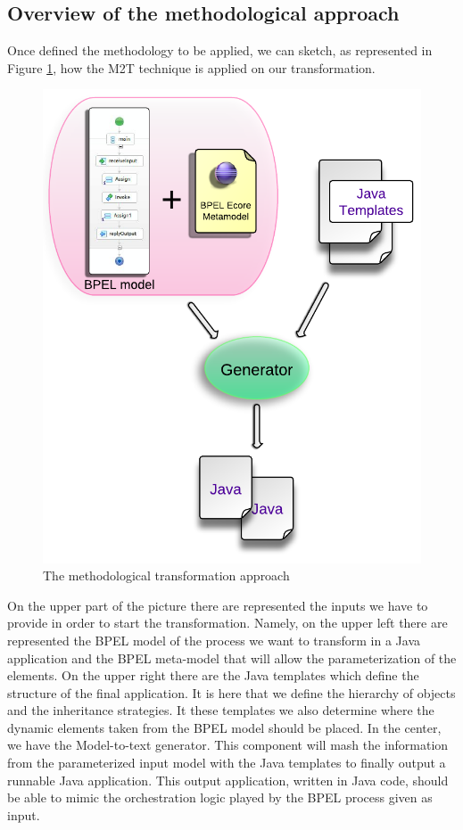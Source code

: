 \subsection{Overview of the methodological approach}
\label{MethodologyOverview}
Once defined the methodology to be applied, we can sketch, as represented in Figure \ref{fig:TransformationApproach}, how the M2T technique is applied on our transformation.
\begin{figure}[ht]
  \begin{center}
    \includegraphics[scale=0.9]{pictures/TransformationApproach.png}
    \caption{The methodological transformation approach}
    \label{fig:TransformationApproach}
  \end{center}
\end{figure}
On the upper part of the picture there are represented the inputs we have to provide in order to start the transformation. Namely, on the upper left there are represented the BPEL model of the process we want to transform in a Java application and the BPEL meta-model that will allow the parameterization of the elements. 
On the upper right there are the Java templates which define the structure of the final application. It is here that we define the hierarchy of objects and the inheritance strategies. It these templates we also determine where the dynamic elements taken from the BPEL model should be placed.  
In the center, we have the Model-to-text generator. This component will mash the information from the parameterized input model with the Java templates to finally output a runnable Java application. This output application, written in Java code, should be able to mimic the orchestration logic played by the BPEL process given as input.  





